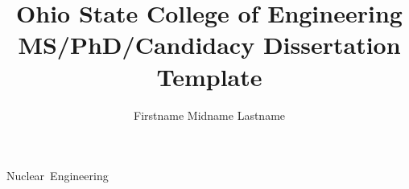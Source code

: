 \documentclass{osudissert96}
\begin{document}

\author{Firstname Midname Lastname}

\title{Ohio State College of Engineering MS/PhD/Candidacy Dissertation Template}


\unit{Nuclear Engineering}


\maketitle


%
%
%
%
%

\disscopyright{}
\end{document}
